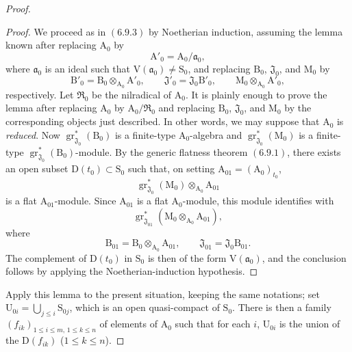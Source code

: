 \begin{proof}
\begin{proof}
We proceed as in $(6.9.3)$ by Noetherian induction, assuming the lemma known after replacing $\mathrm{A}_0$ by
\[
  \mathrm{A}'_0=\mathrm{A}_0/\mathfrak{a}_0,
\]
where $\mathfrak{a}_0$ is an ideal such that $\mathrm{V}(\mathfrak{a}_0)\neq\mathrm{S}_0$, and replacing $\mathrm{B}_0$, $\mathfrak{J}_0$, and $\mathrm{M}_0$ by
\[
  \mathrm{B}'_0=\mathrm{B}_0\otimes_{\mathrm{A}_0}\mathrm{A}'_0,
  \qquad
  \mathfrak{J}'_0=\mathfrak{J}_0\mathrm{B}'_0,
  \qquad
  \mathrm{M}_0\otimes_{\mathrm{A}_0}\mathrm{A}'_0,
\]
respectively. Let $\mathfrak{R}_0$ be the nilradical of $\mathrm{A}_0$. It is plainly enough to prove the lemma after replacing $\mathrm{A}_0$ by $\mathrm{A}_0/\mathfrak{R}_0$ and replacing $\mathrm{B}_0$, $\mathfrak{J}_0$, and $\mathrm{M}_0$ by the corresponding objects just described. In other words, we may suppose that $\mathrm{A}_0$ is \emph{reduced}. Now $\operatorname{gr}^*_{\mathfrak{J}_0}(\mathrm{B}_0)$ is a finite-type $\mathrm{A}_0$-algebra and $\operatorname{gr}^*_{\mathfrak{J}_0}(\mathrm{M}_0)$ is a finite-type $\operatorname{gr}^*_{\mathfrak{J}_0}(\mathrm{B}_0)$-module. By the generic flatness theorem $(6.9.1)$, there exists an open subset $\mathrm{D}(t_0)\subset\mathrm{S}_0$ such that, on setting $\mathrm{A}_{01}=(\mathrm{A}_0)_{t_0}$,
\[
  \operatorname{gr}^*_{\mathfrak{J}_0}(\mathrm{M}_0)
  \otimes_{\mathrm{A}_0}\mathrm{A}_{01}
\]
is a flat $\mathrm{A}_{01}$-module. Since $\mathrm{A}_{01}$ is a flat $\mathrm{A}_0$-module, this module identifies with
\[
  \operatorname{gr}^*_{\mathfrak{J}_{01}}
  (\mathrm{M}_0\otimes_{\mathrm{A}_0}\mathrm{A}_{01}),
\]
where
\[
  \mathrm{B}_{01}=\mathrm{B}_0\otimes_{\mathrm{A}_0}\mathrm{A}_{01},
  \qquad
  \mathfrak{J}_{01}=\mathfrak{J}_0\mathrm{B}_{01}.
\]
The complement of $\mathrm{D}(t_0)$ in $\mathrm{S}_0$ is then of the form $\mathrm{V}(\mathfrak{a}_0)$, and the conclusion follows by applying the Noetherian-induction hypothesis.
\end{proof}

Apply this lemma to the present situation, keeping the same notations; set $\mathrm{U}_{0i}=\bigcup_{j\leqslant i}\mathrm{S}_{0j}$, which is an open quasi-compact of $\mathrm{S}_0$. There is then a family $(f_{ik})_{1\leqslant i\leqslant m,\,1\leqslant k\leqslant n}$ of elements of $\mathrm{A}_0$ such that for each $i$, $\mathrm{U}_{0i}$ is the union of the $\mathrm{D}(f_{ik})$ ($1\leqslant k\leqslant n$).



\end{proof}
